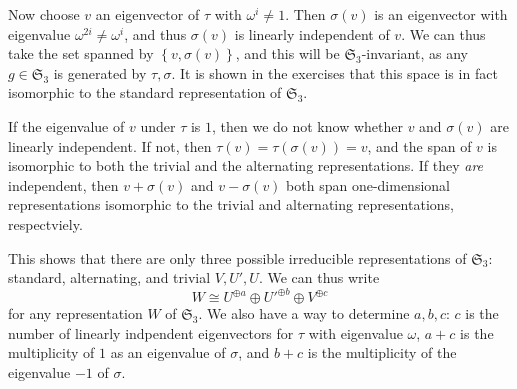 Now choose $v$ an eigenvector of $\tau $ with $\omega^i \neq 1$. Then $\sigma (v)$ is an eigenvector with eigenvalue $\omega ^{2i} \neq \omega ^i$, and thus $\sigma (v)$ is linearly independent of $v$. We can thus take the set spanned by $\left\{ v,\sigma (v) \right\} $, and this will be $\mathfrak{S} _3$-invariant, as any $g\in \mathfrak{S} _3$ is generated by $\tau ,\sigma $. It is shown in the exercises that this space is in fact isomorphic to the standard representation of $\mathfrak{S} _3$.

If the eigenvalue of $v$ under $\tau $ is $1$, then we do not know whether $v$ and $\sigma (v)$ are linearly independent. If not, then $\tau (v)=\tau (\sigma (v))=v$, and the span of $v$ is isomorphic to both the trivial and the alternating representations. If they \emph{are} independent, then $v+\sigma (v)$ and $v-\sigma (v)$ both span one-dimensional representations isomorphic to the trivial  and alternating representations, respectviely.

This shows that there are only three possible irreducible representations of $\mathfrak{S} _3$: standard, alternating, and trivial $V,U',U$. We can thus write
\[
	W\cong U^{\oplus a} \oplus U'^{\oplus b} \oplus V^{\oplus c} 
\]
for any representation $W$ of $\mathfrak{S} _3$. We also have a way to determine $a,b,c$: $c$ is the number of linearly indpendent eigenvectors for $\tau $ with eigenvalue $\omega $, $a+c$ is the multiplicity of $1$ as an eigenvalue of $\sigma $, and $b+c$ is the multiplicity of the eigenvalue $-1$ of $\sigma $.
